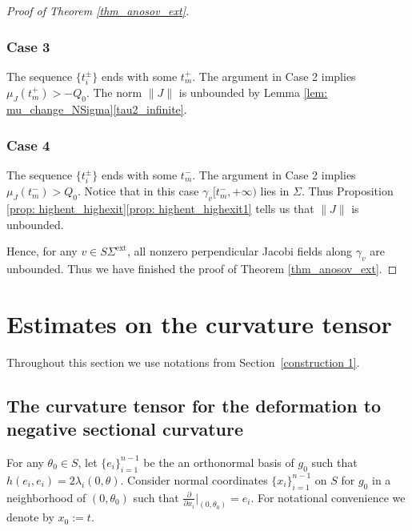 \documentclass[10pt]{amsart}
\newcommand{\ext}{\mathrm{ext}}
\theoremstyle{definition}
\renewcommand{\>}{{\rangle}}
\newcommand{\<}{{\langle}}
\let\Subsection\subsection\let\Subsubsection\subsubsection
\begin{document}
\begin{proof}[Proof of Theorem \ref{thm_anosov_ext}]
\subsubsection*{Case 3} The sequence $\{t_i^{\pm}\}$ ends with some $t^+_m$. The argument in Case 2 implies $\mu_J(t^+_m)>-Q_0$. The norm $\|J\|$ is unbounded by Lemma \ref{lem: mu_change_NSigma}\eqref{tau2_infinite}.

\subsubsection*{Case 4} The sequence $\{t_i^{\pm}\}$ ends with some $t^-_m$. The argument in Case 2 implies $\mu_J(t^-_m)>Q_0$. Notice that in this case $\gamma_v[t^-_m,+\infty)$ lies in $\Sigma$. Thus Proposition \ref{prop: highent_highexit}\eqref{prop: highent_highexit1} tells us that $\|J\|$ is unbounded.

Hence, for any $v\in S\Sigma^{\ext}$, all nonzero perpendicular Jacobi fields along $\gamma_v$ are unbounded. Thus we have finished the proof of Theorem \ref{thm_anosov_ext}.
\end{proof}

\appendix
\section{Estimates on the curvature tensor}

Throughout this section we use notations from Section~\ref{construction 1}.

\Subsection{The curvature tensor for the deformation to negative sectional curvature}

For any $\theta_0\in S$, let $\{e_i\}_{i=1}^{n-1}$ be the an orthonormal basis of $g_0$ such that $h(e_i,e_i)=2\lambda_{i}(0,\theta)$. Consider normal coordinates $\{x_i\}_{i=1}^{n-1}$ on $S$ for $g_0$ in a neighborhood of $(0,\theta_0)$ such that $\frac{\partial}{\partial x_i}|_{(0,\theta_0)}=e_i$. For notational convenience we denote by $x_0:=t$.
\end{document}
